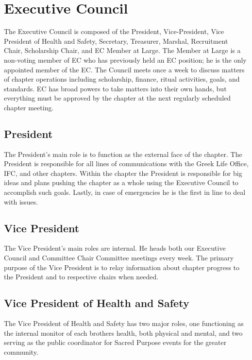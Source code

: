     \section*{Executive Council}
      The Executive Council is composed of the President, Vice-President, Vice President of Health and Safety, Secretary, Treasurer, Marshal, Recruitment Chair, Scholarship Chair, and EC Member at Large. The Member at Large is a non-voting member of EC who has previously held an EC position; he is the only appointed member of the EC. The Council meets once a week to discuss matters of chapter operations including scholarship, finance, ritual activities, goals, and standards. EC has broad powers to take matters into their own hands, but everything must be approved by the chapter at the next regularly scheduled chapter meeting.
      
      \subsection*{President}
	The President's main role is to function as the external face of the chapter. The President is responsible for all lines of communications with the Greek Life Office, IFC, and other chapters. Within the chapter the President is responsible for big ideas and plans pushing the chapter as a whole using the Executive Council to accomplish such goals. Lastly, in case of emergencies he is the first in line to deal with issues.
	
      \subsection*{Vice President}
	The Vice President's main roles are internal. He heads both our Executive Council and Committee Chair Committee meetings every week. The primary purpose of the Vice President is to relay information about chapter progress to the President and to respective chairs when needed.
	
      \subsection*{Vice President of Health and Safety}
	The Vice President of Health and Safety has two major roles, one functioning as the internal monitor of each brothers health, both physical and mental, and two serving as the public coordinator for Sacred Purpose events for the greater community.
	
